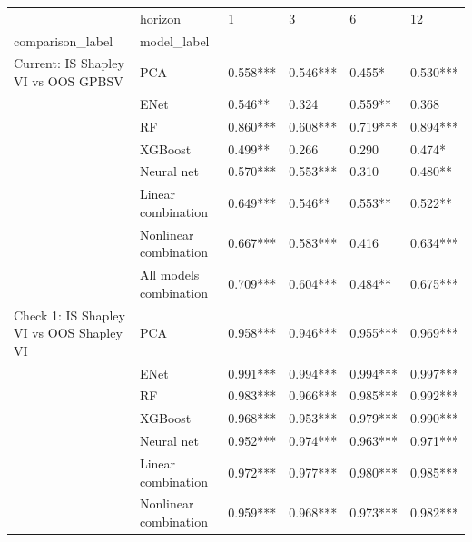 \begin{tabular}{llllll}
\toprule
                                                     & horizon &        1  &        3  &        6  &        12 \\
comparison\_label & model\_label &           &           &           &           \\
\midrule
Current: IS Shapley VI vs OOS GPBSV & PCA &  0.558*** &  0.546*** &    0.455* &  0.530*** \\
                                                     & ENet &   0.546** &     0.324 &   0.559** &     0.368 \\
                                                     & RF &  0.860*** &  0.608*** &  0.719*** &  0.894*** \\
                                                     & XGBoost &   0.499** &     0.266 &     0.290 &    0.474* \\
                                                     & Neural net &  0.570*** &  0.553*** &     0.310 &   0.480** \\
                                                     & Linear combination &  0.649*** &   0.546** &   0.553** &   0.522** \\
                                                     & Nonlinear combination &  0.667*** &  0.583*** &     0.416 &  0.634*** \\
                                                     & All models combination &  0.709*** &  0.604*** &   0.484** &  0.675*** \\
Check 1: IS Shapley VI vs OOS Shapley VI & PCA &  0.958*** &  0.946*** &  0.955*** &  0.969*** \\
                                                     & ENet &  0.991*** &  0.994*** &  0.994*** &  0.997*** \\
                                                     & RF &  0.983*** &  0.966*** &  0.985*** &  0.992*** \\
                                                     & XGBoost &  0.968*** &  0.953*** &  0.979*** &  0.990*** \\
                                                     & Neural net &  0.952*** &  0.974*** &  0.963*** &  0.971*** \\
                                                     & Linear combination &  0.972*** &  0.977*** &  0.980*** &  0.985*** \\
                                                     & Nonlinear combination &  0.959*** &  0.968*** &  0.973*** &  0.982*** \\

\end{tabular}
